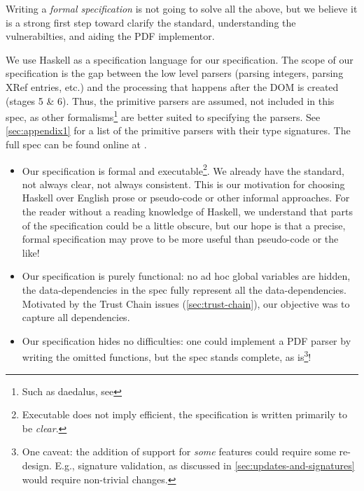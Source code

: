 Writing a \emph{formal specification} is not going to solve all the above,
but we believe it is a strong first step toward clarify the
standard, understanding the vulnerabilties, and aiding the PDF implementor.

We use Haskell \cite{Haskell} as a specification language for
our specification.
%
The scope of our specification is the gap between the low
level parsers (parsing integers, parsing XRef entries, etc.) and the
processing that happens after the DOM is created (stages 5 \& 6).
%
Thus, the primitive parsers are assumed, not included in this spec,
as other formalisms\footnote{Such as daedalus, see \todo{}
} are better suited to specifying the parsers.
See \cref{sec:appendix1} for a list of the primitive parsers
with their type signatures.
%
The full spec can be found online at \cite{daedalusrepo}.

\begin{itemize}
\item Our specification is formal and executable\footnote{
  Executable does not imply efficient, the specification is written
  primarily to be \emph{clear}.}.
  We already have the standard, not always clear, not always
  consistent. 
  This is our motivation for choosing Haskell over English prose or
  pseudo-code or other informal approaches.
  For the reader
  without a reading knowledge of Haskell, we understand that parts of
  the specification could be a little obscure, but our hope is that a
  precise, formal specification may prove to be more useful than
  pseudo-code or the like!
  
\item Our specification is purely functional: no ad hoc global variables are
  hidden, the data-dependencies in the spec fully represent all the
  data-dependencies.  Motivated by the Trust Chain issues
  (\cref{sec:trust-chain}), our objective was to capture all dependencies.
  
\item Our specification hides no difficulties: one could implement a PDF parser
  by writing the omitted functions, but the spec stands complete, as
  is\footnote{One caveat: the addition of support for \emph{some} features
  could require some re-design.  E.g., signature validation, as discussed in
  \cref{sec:updates-and-signatures} would require non-trivial changes.
  }!
\end{itemize}


